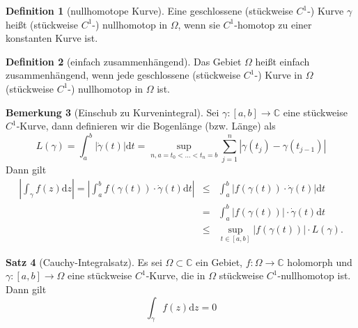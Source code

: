 \documentclass[11pt,titlepage]{article}
\theoremstyle{definition}
\newtheorem{theorem}{Satz}[section]
\newtheorem{definition}[theorem]{Definition}
\newtheorem{remark}[theorem]{Bemerkung}
\theoremstyle{remark}
\begin{document}
	\begin{definition}[nullhomotope Kurve]
		Eine geschlossene (stückweise $C^1$-) Kurve $\gamma$ heißt (stückweise $C^1$-) nullhomotop 
		in $\Omega$, wenn sie $C^1$-homotop zu einer konstanten Kurve ist.
	\end{definition}
	
	\begin{definition}[einfach zusammenhängend]
		Das Gebiet $\Omega$ heißt einfach zusammenhängend, wenn jede geschlossene (stückweise 
		$C^1$-) Kurve in $\Omega$ (stückweise $C^1$-) nullhomotop in $\Omega$ ist.
	\end{definition}
	
	\begin{remark}[Einschub zu Kurvenintegral]
		Sei $\gamma:[a,b]\to\mathbb{C}$ eine stückweise $C^1$-Kurve, dann definieren wir die 
		Bogenlänge (bzw. Länge) als
		\[ L(\gamma)=\int_a^b |\dot{\gamma}(t)|\mathrm{d}t =\sup_{n,a=t_0 <\ldots <t_n =b} 
		\sum_{j=1}^n |\gamma(t_j)-\gamma(t_{j-1})| \]
		Dann gilt
		\begin{eqnarray*}
			\left|\int_{\gamma} f(z)\mathrm{d}z \right| = \left|\int_a^b f(\gamma(t))\cdot 
			\dot{\gamma}(t)\mathrm{d}t \right| 
			&\leq& \int_a^b |f(\gamma(t))\cdot \dot{\gamma}(t) |\mathrm{d}t \\
			&=& \int_a^b |f(\gamma(t))|\cdot \dot{\gamma}(t)\mathrm{d}t \\
			&\leq& \sup_{t\in [a,b]} |f(\gamma(t))| \cdot L(\gamma).
		\end{eqnarray*}
	\end{remark}
	
	\begin{theorem}[Cauchy-Integralsatz] \label{thm:CI}
		Es sei $\Omega\subset\mathbb{C}$ ein Gebiet, $f:\Omega\to\mathbb{C}$ holomorph und 
		$\gamma:[a,b]\to\Omega$ eine stückweise $C^1$-Kurve, die in $\Omega$ stückweise 
		$C^1$-nullhomotop ist. Dann gilt 
		\[ \int_{\gamma} f(z) \mathrm{d}z =0 \]
	\end{theorem}
	
\end{document}
